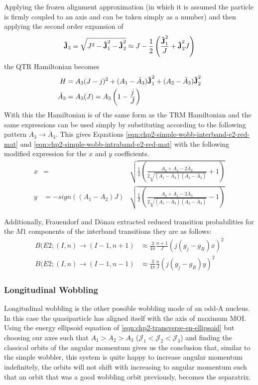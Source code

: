 Applying the frozen alignment approximation (in which it is assumed the particle is firmly coupled to an axis and can be taken simply as a number) and then applying the second order expansion of
\begin{equation}
\boldsymbol{\hat{\textbf{J}}}_3=\sqrt{J^2-\boldsymbol{\hat{\textbf{J}}}_1^2-\boldsymbol{\hat{\textbf{J}}}_2^2}\approx{}J-\frac{1}{2}\left(\frac{\boldsymbol{\hat{\textbf{J}}}_1^2}{J}+\boldsymbol{\hat{\textbf{J}}}_2^2{J}\right)
\end{equation}
the QTR Hamiltonian becomes
\begin{align}
H&=A_3(J-j)^2+(A_1-\bar{A}_3)\boldsymbol{\hat{\textbf{J}}}^2_1+(A_2-\bar{A}_3)\boldsymbol{\hat{\textbf{J}}}^2_2\\
\bar{A}_3&=A_3(J)=A_3\left(1-\frac{j}{J}\right)
\end{align}
With this the Hamiltonian is of the same form as the TRM Hamiltonian and the same expressions can be used simply by substituting according to the following pattern $A_3 \rightarrow\bar{A}_3$. This gives Equations \ref{eqn:chp2-simple-wobb-interband-e2-red-mat} and \ref{eqn:chp2-simple-wobb-intraband-e2-red-mat} with the following modified expression for the $x$ and $y$ coefficients.
\begin{align}
\label{eqn:chp2-simple-wobb-x-y-params-mod}
x&=&\sqrt{\frac{1}{2}\left(\frac{A_2+A_1-2\bar{A}_3}{2\sqrt{(A_1-\bar{A}_3)(A_2-\bar{A}_3)}}+1\right)}\\
y&=-sign((A_1-A_2)J)&\sqrt{\frac{1}{2}\left(\frac{A_2+A_1-2\bar{A}_3}{2\sqrt{(A_1-\bar{A}_3)(A_2-\bar{A}_3)}}-1\right)}\nonumber
\end{align}

Additionally, Frauendorf and D\"onau \cite{frauendorfTransverseWobbling} extracted reduced transition probabilities for the $M1$ components of the interband transitions they are as follows:
\begin{align}
\label{eqn:chp2-simple-wobb-interband-m1-red-mat}
B(E2;(I,n)\rightarrow(I-1,n+1)&\approx\frac{3}{4\pi}\frac{n+1}{J}\left(j(g_j-g_R)x\right)^2\\
B(E2;(I,n)\rightarrow(I-1,n-1)&\approx\frac{3}{4\pi}\frac{n}{J}\left(j(g_j-g_R)y\right)^2
\end{align}

\subsubsection{Longitudinal Wobbling}
\label{sssec:models-wobbling-longitudinal-wobbling}
Longitudinal wobbling is the other possible wobbling mode of an odd-A nucleus. In this case the quasiparticle has aligned itself with the axis of maximum MOI. Using the energy ellipsoid equation of \ref{eqn:chp2-transverse-en-ellipsoid} but choosing our axes such that $A_1>A_2>A_3$ ($\mathcal{J}_1<\mathcal{J}_2<\mathcal{J}_3$) and finding the classical orbits of the angular momentum gives us the conclusion that, similar to the simple wobbler, this system is quite happy to increase angular momentum indefinitely, the orbits will not shift with increasing to angular momentum such that an orbit that was a good wobbling orbit previously, becomes the separatrix.


